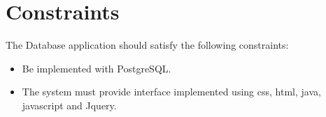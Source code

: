 \color{red}
\section*{Constraints}
\color{black}

The Database application should satisfy the following constraints:
\begin{itemize}

  \item Be implemented with PostgreSQL.
  \item The system must provide interface implemented using css, html, java, javascript and Jquery.
\end{itemize}
